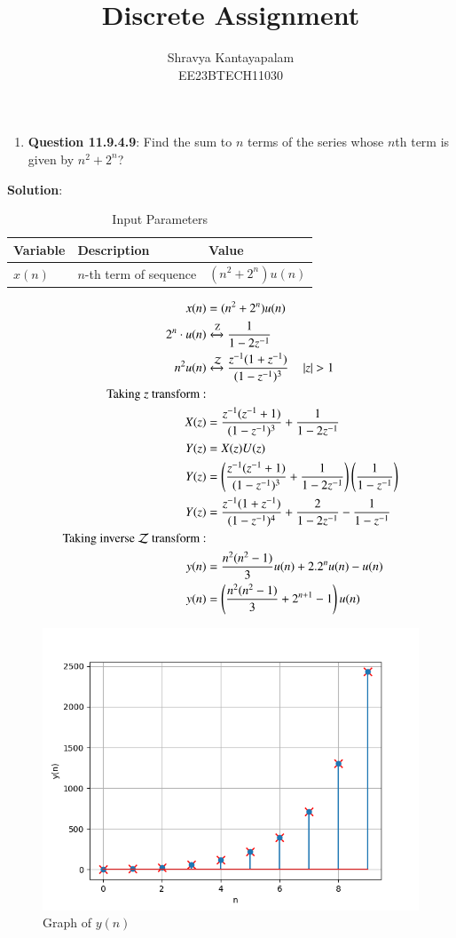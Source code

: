 \documentclass[a4,12pt,onecolumn]{IEEEtran}
\begin{document}
\title{Discrete Assignment}
\author{Shravya Kantayapalam\\ EE23BTECH11030}
\maketitle

\begin{enumerate}
    \item \textbf{Question 11.9.4.9}:
    Find the sum to $n$ terms of the series whose $n$th term is given by $n^2 + 2^n$?
 \end{enumerate}  
    \textbf{Solution}:
\fi 

\begin{table}[htbp]
    \centering
    \caption{Input Parameters}
    \begin{tabular}{|l|l|l|}
    \hline
    \textbf{Variable} & \textbf{Description} & \textbf{Value} \\
    \hline
    \( x(n) \) & \( n \)-th term of sequence & \( (n^2 + 2^n)u(n) \) \\
    \hline
    \end{tabular}
\end{table}
\begin{align}
x(n)&=(n^2+2^n)u(n)\\
2^n \cdot u(n) &\xleftrightarrow{\text{Z}} \frac{1}{1 - 2z^{-1}} \\
n^2u(n) &\xleftrightarrow{\mathcal{Z}} \frac{z^{-1}(1+z^{-1})}{(1-z^{-1})^3} \quad \left\vert z\right\vert>1 \\ 
\text{Taking } z \text{ transform :}\\
X(z)&=\frac{z^{-1}(z^{-1} + 1)}{(1 - z^{-1})^3} +\frac{1}{1 - 2z^{-1}}\\
Y(z)&=X(z)U(z)\\
Y(z)&=\left(\frac{z^{-1}(z^{-1} + 1)}{(1 - z^{-1})^3} +\frac{1}{1 - 2z^{-1}}\right)\left(\frac{1}{1-z^{-1}}\right)\\
Y(z)&=\frac{z^{-1}(1+z^{-1})}{(1-z^{-1})^4}+\frac{2}{1-2z^{-1}}-\frac{1}{1-z^{-1}}\\
\text{Taking inverse } \mathcal{Z} \text{ transform :}\\
y(n)&=\frac{n^2(n^2-1)}{3}u(n)+2.2^nu(n)-u(n)\\
y(n)&=\left(\frac{n^2(n^2-1)}{3}+2^{n+1}-1\right)u(n)
\end{align}
\begin{figure}[ht]
    \centering
    \includegraphics[width=\columnwidth]{figs/main.png}
    \caption{Graph of $y(n)$ }
\end{figure}
\end{document}
